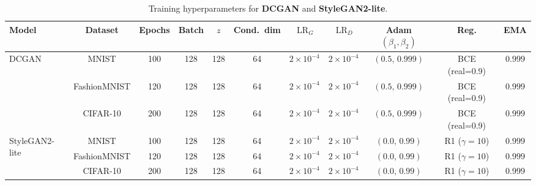 \begin{table}[H]
\centering
\scriptsize
\caption{Training hyperparameters for \textbf{DCGAN} and \textbf{StyleGAN2-lite}.}
\label{tab:gans-train}
\begin{adjustbox}{max width=\linewidth}
\begin{tabular}{@{}lcccccccccc@{}}
\toprule
Model & Dataset & Epochs & Batch & $z$ & Cond.\ dim & $\,\text{LR}_G$ & $\,\text{LR}_D$ & Adam $(\beta_1,\beta_2)$ & Reg. & EMA \\
\midrule
\multirow{3}{*}{DCGAN}
& MNIST        & 100 & 128 & 128 & 64 & $2{\times}10^{-4}$ & $2{\times}10^{-4}$ & $(0.5,\,0.999)$ & BCE (real=0.9) & $0.999$ \\
& FashionMNIST & 120 & 128 & 128 & 64 & $2{\times}10^{-4}$ & $2{\times}10^{-4}$ & $(0.5,\,0.999)$ & BCE (real=0.9) & $0.999$ \\
& CIFAR-10     & 200 & 128 & 128 & 64 & $2{\times}10^{-4}$ & $2{\times}10^{-4}$ & $(0.5,\,0.999)$ & BCE (real=0.9) & $0.999$ \\
\midrule
\multirow{3}{*}{StyleGAN2-lite}
& MNIST        & 100 & 128 & 128 & 64 & $2{\times}10^{-4}$ & $2{\times}10^{-4}$ & $(0.0,\,0.99)$  & R1 ($\gamma{=}10$) & $0.999$ \\
& FashionMNIST & 120 & 128 & 128 & 64 & $2{\times}10^{-4}$ & $2{\times}10^{-4}$ & $(0.0,\,0.99)$  & R1 ($\gamma{=}10$) & $0.999$ \\
& CIFAR-10     & 200 & 128 & 128 & 64 & $2{\times}10^{-4}$ & $2{\times}10^{-4}$ & $(0.0,\,0.99)$  & R1 ($\gamma{=}10$) & $0.999$ \\
\bottomrule
\end{tabular}
\end{adjustbox}
\end{table}


